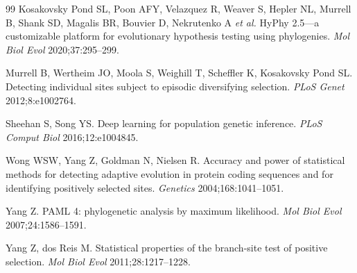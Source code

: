 \documentclass[11pt]{article}
\begin{document}
\begin{thebibliography}{99}
Kosakovsky Pond SL, Poon AFY, Velazquez R, Weaver S, Hepler NL, Murrell B, Shank SD, Magalis BR, Bouvier D, Nekrutenko A \emph{et al.}
HyPhy 2.5---a customizable platform for evolutionary hypothesis testing using phylogenies.
\emph{Mol Biol Evol} 2020;37:295--299.

Murrell B, Wertheim JO, Moola S, Weighill T, Scheffler K, Kosakovsky Pond SL.
Detecting individual sites subject to episodic diversifying selection.
\emph{PLoS Genet} 2012;8:e1002764.

Sheehan S, Song YS.
Deep learning for population genetic inference.
\emph{PLoS Comput Biol} 2016;12:e1004845.

Wong WSW, Yang Z, Goldman N, Nielsen R.
Accuracy and power of statistical methods for detecting adaptive evolution in protein coding sequences and for identifying positively selected sites.
\emph{Genetics} 2004;168:1041--1051.

Yang Z.
PAML 4: phylogenetic analysis by maximum likelihood.
\emph{Mol Biol Evol} 2007;24:1586--1591.

Yang Z, dos Reis M.
Statistical properties of the branch-site test of positive selection.
\emph{Mol Biol Evol} 2011;28:1217--1228.

\end{thebibliography}
\end{document}
